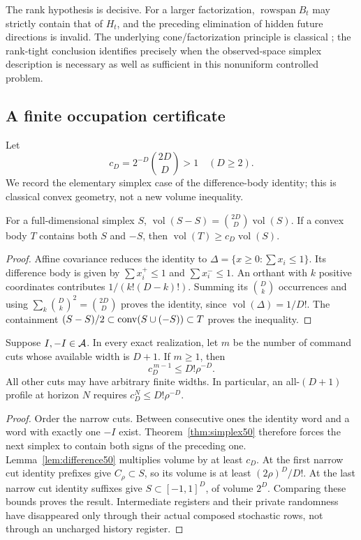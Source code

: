 The rank hypothesis is decisive. For a larger factorization,
$\operatorname{rowspan}B_t$ may strictly contain that of $H_t$, and the
preceding elimination of hidden future directions is invalid. The
underlying cone/factorization principle is classical \cite{BF04}; the
rank-tight conclusion identifies precisely when the observed-space
simplex description is necessary as well as sufficient in this
nonuniform controlled problem.

\subsection{A finite occupation certificate}
Let
\[
 c_D=2^{-D}\binom{2D}{D}>1\quad(D\ge2).
\]
We record the elementary simplex case of the difference-body identity;
this is classical convex geometry, not a new volume inequality.

\begin{lemma}\label{lem:difference50}
For a full-dimensional simplex $S$,
$\operatorname{vol}(S-S)=\binom{2D}{D}\operatorname{vol}(S)$.
If a convex body $T$ contains both $S$ and $-S$, then
$\operatorname{vol}(T)\ge c_D\operatorname{vol}(S)$.
\end{lemma}
\begin{proof}
Affine covariance reduces the identity to
$\Delta=\{x\ge0:\sum x_i\le1\}$. Its difference body is given by
$\sum x_i^+\le1$ and $\sum x_i^-\le1$. An orthant with $k$ positive
coordinates contributes $1/(k!(D-k)!)$. Summing its $\binom{D}{k}$
occurrences and using $\sum_k\binom{D}{k}^2=\binom{2D}{D}$ proves the
identity, since $\operatorname{vol}(\Delta)=1/D!$. The containment
$(S-S)/2\subset\operatorname{conv}(S\cup(-S))\subset T$ proves the inequality.
\end{proof}

\begin{theorem}\label{thm:occupation50}
Suppose $I,-I\in\mathcal A$. In every exact realization, let $m$ be the
number of command cuts whose available width is $D+1$. If $m\ge1$, then
\begin{equation}\label{eq:occupation50}
 c_D^{\,m-1}\le D!\rho^{-D}.
\end{equation}
All other cuts may have arbitrary finite widths. In particular, an
all-$(D+1)$ profile at horizon $N$ requires
$c_D^N\le D!\rho^{-D}$.
\end{theorem}
\begin{proof}
Order the narrow cuts. Between consecutive ones the identity word and
a word with exactly one $-I$ exist. Theorem~\ref{thm:simplex50} therefore
forces the next simplex to contain both signs of the preceding one.
Lemma~\ref{lem:difference50} multiplies volume by at least $c_D$.
At the first narrow cut identity prefixes give $C_\rho\subset S$,
so its volume is at least $(2\rho)^D/D!$. At the last narrow cut
identity suffixes give $S\subset[-1,1]^D$, of volume $2^D$.
Comparing these bounds proves the result. Intermediate registers and
their private randomness have disappeared only through their actual
composed stochastic rows, not through an uncharged history register.
\end{proof}

